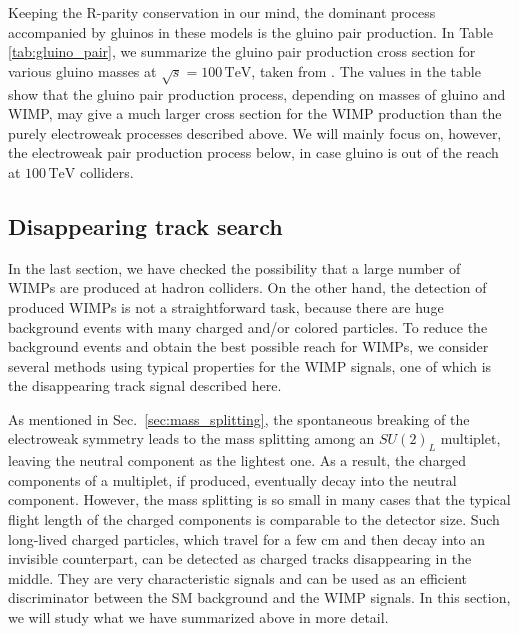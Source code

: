 \documentclass[12pt,twoside,book]{article}
\begin{document}
Keeping the R-parity conservation in our mind, the dominant process accompanied by gluinos in these models is the gluino pair production.
In Table \ref{tab:gluino_pair}, we summarize the gluino pair production cross section for various gluino masses at $\sqrt{s} = 100\,\mathrm{TeV}$, taken from \cite{Asai:2019wst}.
The values in the table show that the gluino pair production process, depending on masses of gluino and WIMP, may give a much larger cross section for the WIMP production than the purely electroweak processes described above.
We will mainly focus on, however, the electroweak pair production process below, in case gluino is out of the reach at $100\,\mathrm{TeV}$ colliders.


\subsection{Disappearing track search}
\label{sec:disappearing_track}

In the last section, we have checked the possibility that a large number of WIMPs are produced at hadron colliders.
On the other hand, the detection of produced WIMPs is not a straightforward task, because there are huge background events with many charged and/or colored particles.
To reduce the background events and obtain the best possible reach for WIMPs, we consider several methods using typical properties for the WIMP signals, one of which is the disappearing track signal described here.

As mentioned in Sec.~\ref{sec:mass_splitting}, the spontaneous breaking of the electroweak symmetry leads to the mass splitting among an $SU(2)_L$ multiplet, leaving the neutral component as the lightest one.
As a result, the charged components of a multiplet, if produced, eventually decay into the neutral component.
However, the mass splitting is so small in many cases that the typical flight length of the charged components is comparable to the detector size.
Such long-lived charged particles, which travel for a few $\mathrm{cm}$ and then decay into an invisible counterpart, can be detected as charged tracks disappearing in the middle.
They are very characteristic signals and can be used as an efficient discriminator between the SM background and the WIMP signals.
In this section, we will study what we have summarized above in more detail.
\end{document}

